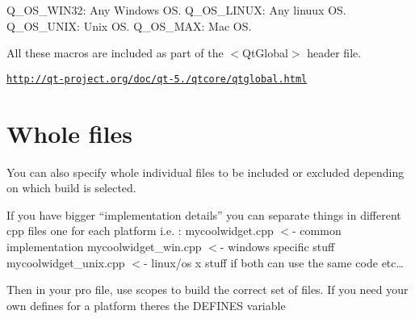 \begin{DoxyEnumerate}
\item Q\-\_\-\-O\-S\-\_\-\-W\-I\-N32\-: Any Windows O\-S. Q\-\_\-\-O\-S\-\_\-\-L\-I\-N\-U\-X\-: Any linuux O\-S. Q\-\_\-\-O\-S\-\_\-\-U\-N\-I\-X\-: Unix O\-S. Q\-\_\-\-O\-S\-\_\-\-M\-A\-X\-: Mac O\-S.
\end{DoxyEnumerate}

All these macros are included as part of the $<$\-Qt\-Global$>$ header file.

\href{http://qt-project.org/doc/qt-5.0/qtcore/qtglobal.html}{\tt http\-://qt-\/project.\-org/doc/qt-\/5./qtcore/qtglobal.\-html}

\section*{Whole files}

You can also specify whole individual files to be included or excluded depending on which build is selected.

If you have bigger “implementation details” you can separate things in different cpp files one for each platform i.\-e. \-: mycoolwidget.\-cpp $<$-\/ common implementation mycoolwidget\-\_\-win.\-cpp $<$-\/ windows specific stuff mycoolwidget\-\_\-unix.\-cpp $<$-\/ linux/os x stuff if both can use the same code etc…

Then in your pro file, use scopes to build the correct set of files. If you need your own defines for a platform theres the D\-E\-F\-I\-N\-E\-S variable 